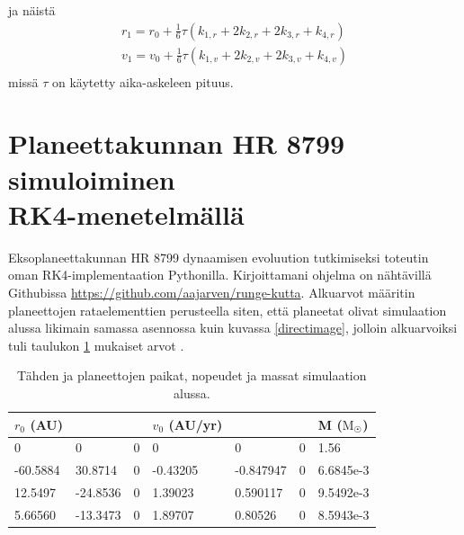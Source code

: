 \documentclass[12pt,a4paper,titlepage]{article}
\begin{document}
ja näistä
\begin{align*}
	r_1 = r_0 + \frac{1}{6}\tau(k_{1,r} + 2k_{2,r} + 2k_{3,r} + k_{4,r}) \\
	v_1 = v_0 + \frac{1}{6}\tau(k_{1,v} + 2k_{2,v} + 2k_{3,v} + k_{4,v}) \\
\end{align*}
missä $\tau$ on käytetty aika-askeleen pituus.\cite{voesnek}

\section{Planeettakunnan HR 8799 simuloiminen\\RK4-menetelmällä}
Eksoplaneettakunnan HR 8799 dynaamisen evoluution tutkimiseksi toteutin oman RK4-implementaation Pythonilla. Kirjoittamani ohjelma on nähtävillä Githubissa \url{https://github.com/aajarven/runge-kutta}. Alkuarvot määritin planeettojen rataelementtien perusteella siten, että planeetat olivat simulaation alussa likimain samassa asennossa kuin kuvassa \ref{directimage}, jolloin alkuarvoiksi tuli taulukon \ref{alkuarvotaulukko} mukaiset arvot \cite{exob, exoc, exod, exoe}.

\begin{table}
	\begin{centering}
		\begin{tabular}{| l l l | l l l | l|}
			\hline
			$r_0$ (AU) & & & $v_0$ (AU/yr) & & & M ($\text{M}_{\astrosun}$)\\
			\hline
			0 & 0 & 0 & 0 & 0 & 0 & 1.56 \\
			-60.5884 & 30.8714 & 0 & -0.43205 & -0.847947 & 0 & 6.6845e-3 \\
			12.5497 & -24.8536 & 0 & 1.39023 & 0.590117 & 0 & 9.5492e-3 \\
			5.66560 & -13.3473 & 0 & 1.89707 & 0.80526 & 0 & 8.5943e-3 \\
			\hline
		\end{tabular}
		\caption{Tähden ja planeettojen paikat, nopeudet ja massat simulaation alussa.}
	\end{centering}
	\label{alkuarvotaulukko}
\end{table}
\end{document}

